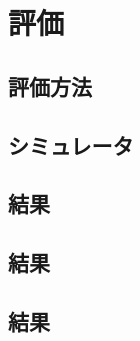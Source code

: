 \chapter{評価} \label{chapter:evaluate}

\section{評価方法} \label{section:evaluate method}


\section{シミュレータ} \label{section:evaluate method}


\section{結果} \label{section:evaluate method}


\section{結果} \label{section:evaluate method}

\section{結果} \label{section:evaluate method}
